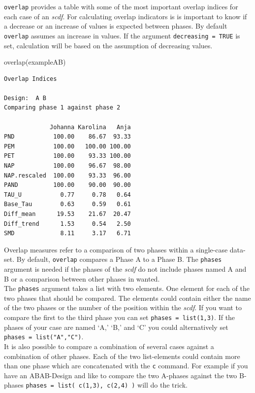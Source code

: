 \documentclass[
]{book}
\newenvironment{Shaded}{\begin{snugshade}}{\end{snugshade}}
\newcommand{\FunctionTok}[1]{\textcolor[rgb]{0.00,0.00,0.00}{#1}}
\newcommand{\NormalTok}[1]{#1}
\begin{document}
\texttt{overlap} provides a table with some of the most important overlap indices for each case of an \emph{scdf}. For calculating overlap indicators is is important to know if a decrease or an increase of values is expected between phases. By default \texttt{overlap} assumes an increase in values. If the argument \texttt{decreasing\ =\ TRUE} is set, calculation will be based on the assumption of decreasing values.

\begin{Shaded}
\begin{Highlighting}[]
\FunctionTok{overlap}\NormalTok{(exampleAB)}
\end{Highlighting}
\end{Shaded}

\begin{verbatim}
Overlap Indices

Design:  A B 
Comparing phase 1 against phase 2 

             Johanna Karolina   Anja
PND           100.00    86.67  93.33
PEM           100.00   100.00 100.00
PET           100.00    93.33 100.00
NAP           100.00    96.67  98.00
NAP.rescaled  100.00    93.33  96.00
PAND          100.00    90.00  90.00
TAU_U           0.77     0.78   0.64
Base_Tau        0.63     0.59   0.61
Diff_mean      19.53    21.67  20.47
Diff_trend      1.53     0.54   2.50
SMD             8.11     3.17   6.71
\end{verbatim}

Overlap measures refer to a comparison of two phases within a single-case data-set. By default, \texttt{overlap} compares a Phase A to a Phase B. The \texttt{phases} argument is needed if the phases of the \emph{scdf} do not include phases named A and B or a comparison between other phases in wanted.\\
The \texttt{phases} argument takes a list with two elements. One element for each of the two phases that should be compared. The elements could contain either the name of the two phases or the number of the position within the \emph{scdf}. If you want to compare the first to the third phase you can set \texttt{phases\ =\ list(1,3)}. If the phases of your case are named `A,' `B,' and `C' you could alternatively set \texttt{phases\ =\ list("A","C")}.\\
It is also possible to compare a combination of several cases against a combination of other phases. Each of the two list-elements could contain more than one phase which are concatenated with the \texttt{c} command. For example if you have an ABAB-Design and like to compare the two A-phases against the two B-phases \texttt{phases\ =\ list(\ c(1,3),\ c(2,4)\ )} will do the trick.
\end{document}
